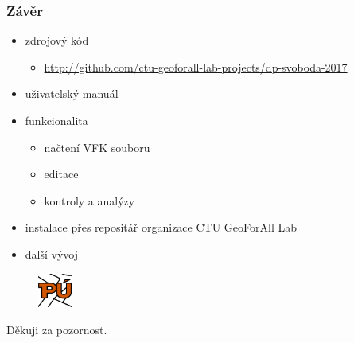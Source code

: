 \documentclass{beamer}
\begin{document}
\begin{frame}

\frametitle{Závěr}

\begin{itemize}
	\item zdrojový kód
	\begin{itemize}
		\item \url{http://github.com/ctu-geoforall-lab-projects/dp-svoboda-2017}
	\end{itemize}
	\item uživatelský manuál
	\item funkcionalita
	\begin{itemize}
		\item načtení VFK souboru
		\item editace
		\item kontroly a analýzy
	\end{itemize}
	\item instalace přes repositář organizace CTU GeoForAll Lab
	\item další vývoj
\end{itemize}

\begin{figure}[ht]
	\includegraphics[width=0.1\textwidth]{pictures/puplugin.png}
\end{figure}


\end{frame}


\begin{frame}
\Huge{\centerline{Děkuji za pozornost.}}
\end{frame}


% 
% 
% 
% 


\end{document}
